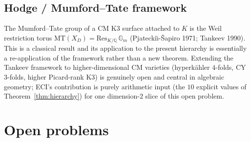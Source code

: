\documentclass[12pt]{amsart}
\theoremstyle{definition}
\newcommand{\Q}{\mathbb{Q}}
\begin{document}
\subsection{Hodge / Mumford--Tate framework}

The Mumford--Tate group of a CM K3 surface attached to $K$ is the
Weil restriction torus
$\mathrm{MT}(X_D) = \mathrm{Res}_{K/\Q}\,\mathbb{G}_m$
(Pjatecki\u{\i}-\v{S}apiro 1971; Tankeev 1990). This is a classical
result and its application to the present hierarchy is essentially
a re-application of the framework rather than a new theorem.
Extending the Tankeev framework to higher-dimensional CM varieties
(hyperk\"ahler $4$-folds, CY $3$-folds, higher Picard-rank K3) is
genuinely open and central in algebraic geometry; ECI's contribution
is purely arithmetic input (the $10$ explicit values of
Theorem~\ref{thm:hierarchy}) for one dimension-$2$ slice of this open
problem.

\section{Open problems}
\label{sec:open}
\end{document}
